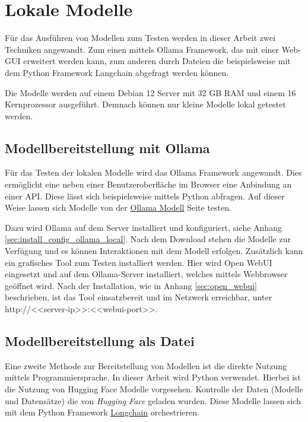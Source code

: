 \section{Lokale Modelle}
Für das Ausführen von Modellen zum Testen werden in dieser Arbeit zwei Techniken angewandt. Zum einen mittels Ollama Framework, das mit einer Web-GUI erweitert werden kann, zum anderen durch Dateien die beispielsweise mit dem Python Framework Langchain abgefragt werden können.\vspace{0.2cm}

Die Modelle werden auf einem Debian 12 Server mit 32 GB RAM und einem 16 Kernprozessor ausgeführt. Demnach können nur kleine Modelle lokal getestet werden.\vspace{0.2cm}

\subsection{Modellbereitstellung mit Ollama}
Für das Testen der lokalen Modelle wird das Ollama Framework angewandt. Dies ermöglicht eine neben einer Benutzeroberfläche im Browser eine Anbindung an einer API. Diese lässt sich beispielsweise mittels Python abfragen. Auf dieser Weise lassen sich Modelle von der \href{https://ollama.com/search}{Ollama Modell} Seite testen.\vspace{0.2cm}

Dazu wird Ollama auf dem Server installiert und konfiguriert, siehe Anhang \ref{sec:install_config_ollama_local}. Nach dem Download stehen die Modelle zur Verfügung und es können Interaktionen mit dem Modell erfolgen. Zusätzlich kann ein grafisches Tool zum Testen installiert werden. Hier wird Open WebUI eingesetzt und auf dem Ollama-Server installiert, welches mittels Webbrowser geöffnet wird. Nach der Installation, wie in Anhang \ref{sec:open_webui} beschrieben, ist das Tool einsatzbereit und im Netzwerk erreichbar, unter http://<<server-ip>>:<<webui-port>>.

\subsection{Modellbereitstellung als Datei}
Eine zweite Methode zur Bereitstellung von Modellen ist die direkte Nutzung mittels Programmiersprache. In dieser Arbeit wird Python verwendet. Hierbei ist die Nutzung von Hugging Face Modelle vorgesehen. Kontrolle der Daten (Modelle und Datensätze) die von \textit{Hugging Face} geladen wurden. Diese Modelle lassen sich mit dem Python Framework \href{https://pypi.org/project/langchain/}{Longchain} orchestrieren.\vspace{0.2cm}

